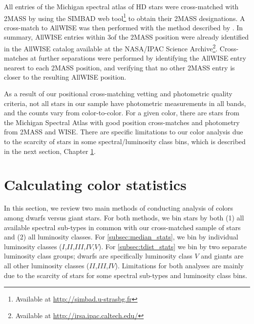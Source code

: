 All entries of the Michigan spectral atlas of HD stars were cross-matched with 2MASS \citep{Skrutskie2006} by using the SIMBAD web tool\footnote{Available at \url{http://simbad.u-strasbg.fr}} to obtain their 2MASS designations. A cross-match to AllWISE \cite{ALLWISE,ALLWISE-dwarfs} was then performed with the method described by \cite{BANYAN}. In summary, AllWISE entries within 3\arcsec of the 2MASS position were already identified in the AllWISE catalog available at the NASA/IPAC Science Archive\footnote{Available at \url{http://irsa.ipac.caltech.edu/}}. Cross-matches at further separations were performed by identifying the AllWISE entry nearest to each 2MASS position, and verifying that no other 2MASS entry is closer to the resulting AllWISE position.

As a result of our positional cross-matching vetting and photometric quality criteria, not all stars in our sample have photometric measurements in all bands, and the counts vary from color-to-color. For a given color, there are \bincount stars from the Michigan Spectral Atlas with good position cross-matches and photometry from 2MASS and WISE. There are specific limitations to our color analysis due to the scarcity of stars in some spectral/luminosity class bins, which is described in the next section, Chapter \ref{sec:color_stats}.

\section{Calculating color statistics} \label{sec:color_stats}
In this section, we review two main methods of conducting analysis of colors among dwarfs versus giant stars. For both methods, we bin stars by both (1) all available spectral sub-types in common with our cross-matched sample of \bincount stars and (2) all luminosity classes. For \ref{subsec:median_stats}, we bin by individual luminosity classes ($I$,$II$,$III$,$IV$,$V$). For \ref{subsec:tdist_stats} we bin by two separate luminosity class groups; dwarfs are specifically luminosity class $V$ and giants are all other luminosity classes ($II$,$III$,$IV$). Limitations for both analyses are mainly due to the scarcity of stars for some spectral sub-types and luminosity class bins. 

